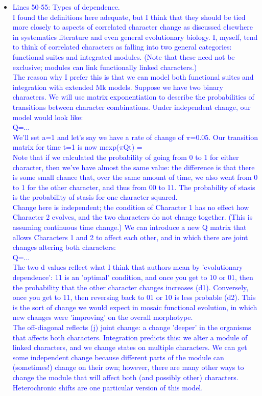 \documentclass[12pt,letterpaper]{article}
\begin{document}
\begin{itemize}
\item{\textcolor{blue}{Lines 50-55: Types of dependence.
\\
I found the definitions here adequate, but I think that they should be tied more closely to aspects of correlated character change as discussed elsewhere in systematics literature and even general evolutionary biology. I, myself, tend to think of correlated characters as falling into two general categories: functional suites and integrated modules. (Note that these need not be exclusive; modules can link functionally linked characters.)
\\
The reason why I prefer this is that we can model both functional suites and integration with extended Mk models. Suppose we have two binary characters. We will use matrix exponentiation to describe the probabilities of transitions between character combinations. Under independent change, our model would look like:
\\
Q=...
\\
We'll set a=1 and let's say we have a rate of change of $\pi$=0.05. Our transition matrix for time t=1 is now mexp($\pi$Qt) =
\\
Note that if we calculated the probability of going from 0 to 1 for either character, then we've have almost the same value: the difference is that there is some small chance that, over the same amount of time, we also went from 0 to 1 for the other character, and thus from 00 to 11. The probability of stasis is the probability of stasis for one character squared.
\\
Change here is independent; the condition of Character 1 has no effect how Character 2 evolves, and the two characters do not change together. (This is assuming continuous time change.) We can introduce a new Q matrix that allows Characters 1 and 2 to affect each other, and in which there are joint changes altering both characters:
\\
Q=...
\\
The two d values reflect what I think that authors mean by 'evolutionary dependence': 11 is an 'optimal' condition, and once you get to 10 or 01, then the probability that the other character changes increases (d1). Conversely, once you get to 11, then reversing back to 01 or 10 is less probable (d2). This is the sort of change we would expect in mosaic functional evolution, in which new changes were 'improving' on the overall morphotype.
\\
The off-diagonal reflects (j) joint change: a change 'deeper' in the organisms that affects both characters. Integration predicts this: we alter a module of linked characters, and we change states on multiple characters. We can get some independent change because different parts of the module can (sometimes!) change on their own; however, there are many other ways to change the module that will affect both (and possibly other) characters. Heterochronic shifts are one particular version of this model.
}}
\end{itemize}
\end{document}
